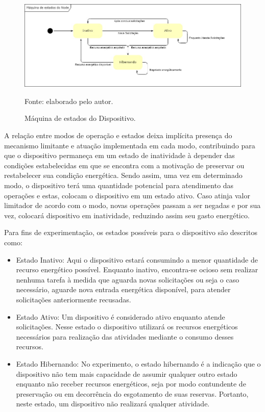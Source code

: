 \begin{figure}[H]
	\centering
	
	\caption{Máquina de estados do Dispositivo.}
	\label{fig:cap6maquinaestados}
	\noindent\includegraphics[width=0.75\linewidth]{Imagens/cap6/cap6maquinaestados.jpg} 
	
	Fonte: elaborado pelo autor.
\end{figure}

A relação entre modos de operação e estados deixa implícita presença do mecanismo limitante e atuação implementada em cada modo, contribuindo para que o dispositivo permaneça em um estado de inatividade à depender das condições estabelecidas em que se encontra com a motivação de preservar ou restabelecer sua condição energética. Sendo assim, uma vez em determinado modo, o dispositivo terá uma quantidade potencial para atendimento das operações e estas, colocam o dispositivo em um estado ativo. Caso atinja valor limitador de acordo com o modo, novas operações passam a ser negadas e por sua vez, colocará dispositivo em inatividade, reduzindo assim seu gasto energético.

Para fins de experimentação, os estados possíveis para o dispositivo são descritos como:
\begin{itemize}
	\item Estado Inativo: Aqui o dispositivo estará consumindo a menor quantidade de recurso energético possível. Enquanto inativo, encontra-se ocioso sem realizar nenhuma tarefa à medida que aguarda novas solicitações ou seja o caso necessário, aguarde nova entrada energética disponível, para atender solicitações anteriormente recusadas.
	\item Estado Ativo: Um dispositivo é considerado ativo enquanto atende solicitações. Nesse estado o dispositivo utilizará os recursos energéticos necessários para realização das atividades mediante o consumo desses recursos. 
	
	\item Estado Hibernando: No experimento, o estado hibernando é a indicação que o dispositivo não tem mais capacidade de assumir qualquer outro estado enquanto não receber recursos energéticos, seja por modo contundente de preservação ou em decorrência do esgotamento de suas reservas. Portanto, neste estado, um dispositivo não realizará qualquer atividade.	
	
\end{itemize}




